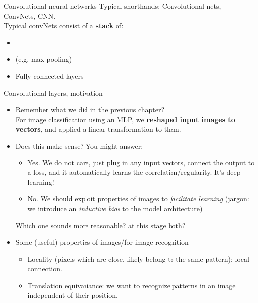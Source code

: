 \begin{frame}{Convolutional neural networks}
Typical shorthands: Convolutional nets, ConvNets, CNN.\\
\vsp
Typical convNets consist of a \textbf{stack} of:
\begin{itemize}
\item {}
\item {} (e.g. max-pooling)
\item Fully connected layers
\end{itemize}
\end{frame}

\begin{frame}{Convolutional layers, motivation}
\begin{itemize}
\item Remember what we did in the previous chapter?\\ For image classification using an MLP, we \textbf{reshaped input images to vectors},
and applied a linear transformation to them.
\vsp
\item Does this make sense? You might answer:
\begin{itemize}
\item Yes. We do not care, just plug in any input vectors, connect the output to a loss, and it automatically learns the correlation/regularity. It's deep learning!
\item No. We should exploit properties of images to \textit{facilitate learning} (jargon: we introduce an \textit{inductive bias} to the model architecture)
\end{itemize}
Which one sounds more reasonable? at this stage both?
\vsp
\pause
\item Some (useful) properties of images/for image recognition
\begin{itemize}
\item Locality (pixels which are close, likely belong to the same pattern): local connection.
\item Translation equivariance: we want to recognize patterns in an image independent of their position.
\end{itemize}
\end{itemize}
\end{frame}

